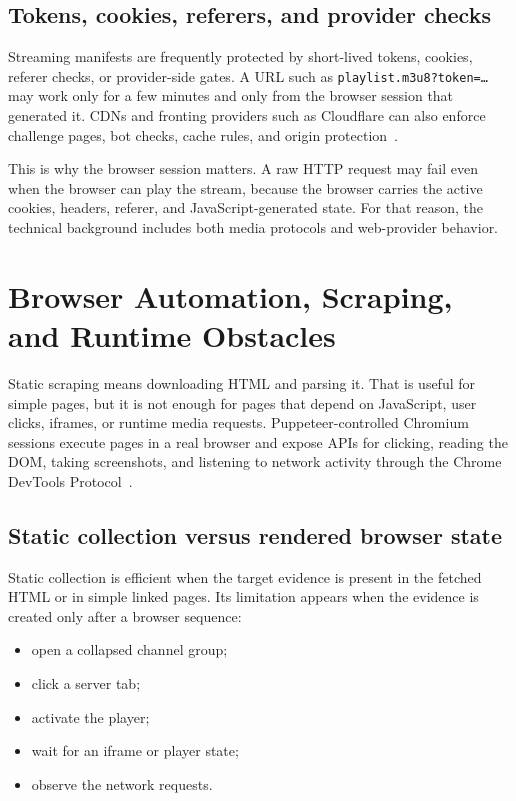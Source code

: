 \subsection{Tokens, cookies, referers, and provider checks}

Streaming manifests are frequently protected by short-lived tokens, cookies, referer
checks, or provider-side gates. A URL such as \texttt{playlist.m3u8?token=\ldots} may work
only for a few minutes and only from the browser session that generated it. CDNs and
fronting providers such as Cloudflare can also enforce challenge pages, bot checks,
cache rules, and origin protection~\cite{cloudflare-challenges}.

This is why the browser session matters. A raw HTTP request may fail even when the
browser can play the stream, because the browser carries the active cookies, headers,
referer, and JavaScript-generated state. For that reason, the technical background includes
both media protocols and web-provider behavior.

\section{Browser Automation, Scraping, and Runtime Obstacles}

Static scraping means downloading HTML and parsing it. That is useful for simple pages,
but it is not enough for pages that depend on JavaScript, user clicks, iframes, or
runtime media requests. Puppeteer-controlled Chromium sessions execute pages in a real
browser and expose APIs for clicking, reading the DOM, taking screenshots, and listening
to network activity through the Chrome DevTools Protocol~\cite{puppeteer,cdp}.

\subsection{Static collection versus rendered browser state}

Static collection is efficient when the target evidence is present in the fetched HTML
or in simple linked pages. Its limitation appears when the evidence is created only
after a browser sequence:
\begin{itemize}
  \item open a collapsed channel group;
  \item click a server tab;
  \item activate the player;
  \item wait for an iframe or player state;
  \item observe the network requests.
\end{itemize}

